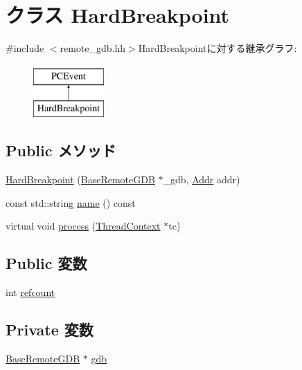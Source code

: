 \hypertarget{classBaseRemoteGDB_1_1HardBreakpoint}{
\section{クラス HardBreakpoint}
\label{classBaseRemoteGDB_1_1HardBreakpoint}
}


{\ttfamily \#include $<$remote\_\-gdb.hh$>$}HardBreakpointに対する継承グラフ:\begin{figure}[H]
\begin{center}
\leavevmode
\includegraphics[height=2cm]{classBaseRemoteGDB_1_1HardBreakpoint}
\end{center}
\end{figure}
\subsection*{Public メソッド}
\begin{DoxyCompactItemize}
\item 
\hyperlink{classBaseRemoteGDB_1_1HardBreakpoint_aa377dd693f72123285321aa65568be3d}{HardBreakpoint} (\hyperlink{classBaseRemoteGDB}{BaseRemoteGDB} $\ast$\_\-gdb, \hyperlink{base_2types_8hh_af1bb03d6a4ee096394a6749f0a169232}{Addr} addr)
\item 
const std::string \hyperlink{classBaseRemoteGDB_1_1HardBreakpoint_a6490f765a824ced1cc94979609fe7e07}{name} () const 
\item 
virtual void \hyperlink{classBaseRemoteGDB_1_1HardBreakpoint_ad66a9d5ec7cfe597b848a17c0df5cc28}{process} (\hyperlink{classThreadContext}{ThreadContext} $\ast$tc)
\end{DoxyCompactItemize}
\subsection*{Public 変数}
\begin{DoxyCompactItemize}
\item 
int \hyperlink{classBaseRemoteGDB_1_1HardBreakpoint_a6022c8a609170c7365fb96e83cb2df48}{refcount}
\end{DoxyCompactItemize}
\subsection*{Private 変数}
\begin{DoxyCompactItemize}
\item 
\hyperlink{classBaseRemoteGDB}{BaseRemoteGDB} $\ast$ \hyperlink{classBaseRemoteGDB_1_1HardBreakpoint_abc7630d7a55d0751927fed9b12d7b202}{gdb}
\end{DoxyCompactItemize}


